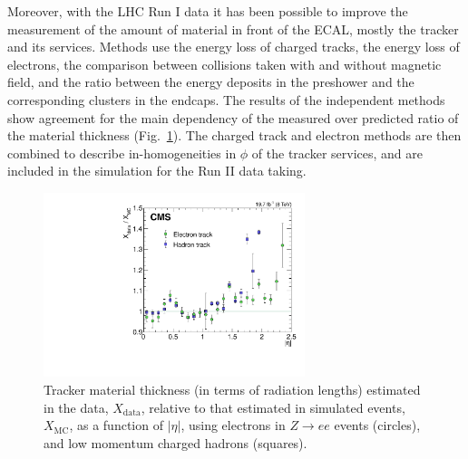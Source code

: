 \documentclass[journal]{IEEEtran}
\begin{document}
Moreover, with the LHC Run I data it has been possible to improve the measurement of the amount of material in front of the ECAL, mostly the tracker and its services. Methods use the energy loss of charged tracks, the energy loss of electrons, the comparison between collisions taken with and without magnetic field, and the ratio between the energy deposits in the preshower and the corresponding clusters in the endcaps. The results of the independent methods show agreement for the main dependency of the measured over predicted ratio of the material thickness (Fig.~\ref{fig:material}). The charged track and electron methods are then combined to describe in-homogeneities in $\phi$ of the tracker services, and are included in the simulation for the Run II data taking.
%
\begin{figure}[!t]
  \begin{center}
    \includegraphics[width=3.0in]{material}
    \caption{Tracker material thickness (in terms of radiation lengths) estimated in the data, $X_\mathrm{data}$, relative to that estimated in simulated events, $X_\mathrm{MC}$, as a function of $\vert\eta\vert$, using electrons in $Z\to ee$ events (circles), and low momentum charged hadrons (squares). \label{fig:material}}
  \end{center}
\end{figure}
%
\end{document}
